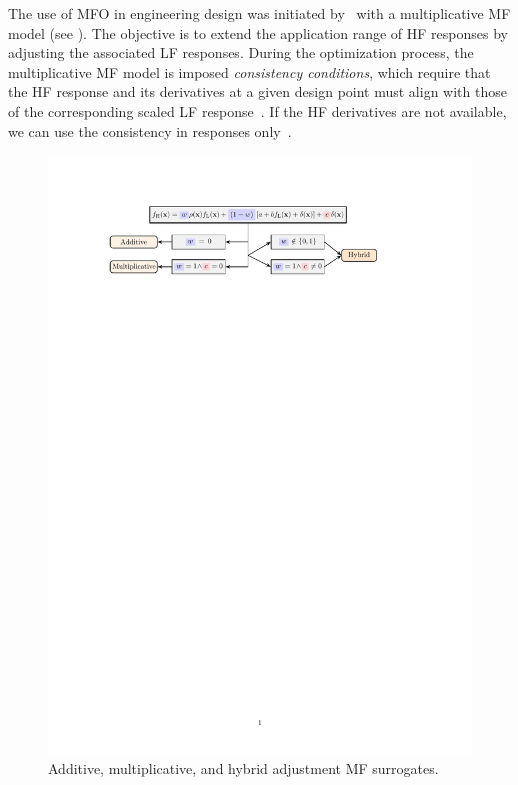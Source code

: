 \documentclass[iicol,sn-basic]{sn-jnl}%
\begin{document}
The use of MFO in engineering design was initiated by~\cite{Haftka1991} with a multiplicative MF model (see ).
The objective is to extend the application range of HF responses by adjusting the associated LF responses.
During the optimization process, the multiplicative MF model is imposed \textit{consistency conditions}, which require that the HF response and its derivatives at a given design point must align with those of the corresponding scaled LF response~\citep{Alexandrov2001}.
If the HF derivatives are not available, we can use the consistency in responses only~\citep{Rodriguez2001}.

\begin{figure}
	\centering
	\includegraphics[scale=0.9]{Fig3.pdf}
	\caption{Additive, multiplicative, and hybrid adjustment MF surrogates.}
	\label{Fig-3}
\end{figure}
\end{document}
